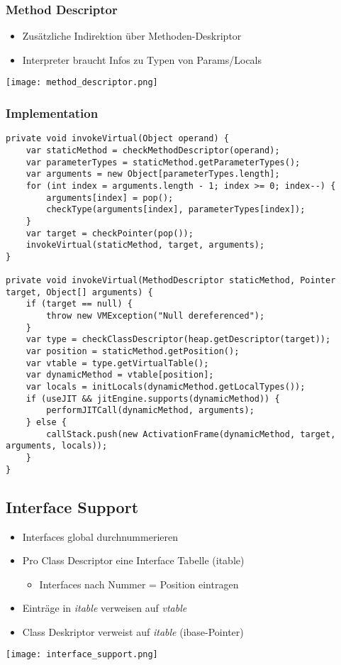 \subsubsection{Method Descriptor}
\begin{itemize}
    \item Zusätzliche Indirektion über Methoden-Deskriptor
    \item Interpreter braucht Infos zu Typen von Params/Locals
\end{itemize}
\texttt{[image: method\_descriptor.png]}
\subsubsection{Implementation}
\begin{lstlisting}
private void invokeVirtual(Object operand) {
    var staticMethod = checkMethodDescriptor(operand);
    var parameterTypes = staticMethod.getParameterTypes();
    var arguments = new Object[parameterTypes.length];
    for (int index = arguments.length - 1; index >= 0; index--) {
        arguments[index] = pop();
        checkType(arguments[index], parameterTypes[index]);
    }
    var target = checkPointer(pop());
    invokeVirtual(staticMethod, target, arguments);
}

private void invokeVirtual(MethodDescriptor staticMethod, Pointer target, Object[] arguments) {
    if (target == null) {
        throw new VMException("Null dereferenced");
    }
    var type = checkClassDescriptor(heap.getDescriptor(target));
    var position = staticMethod.getPosition();
    var vtable = type.getVirtualTable();
    var dynamicMethod = vtable[position];
    var locals = initLocals(dynamicMethod.getLocalTypes());
    if (useJIT && jitEngine.supports(dynamicMethod)) {
        performJITCall(dynamicMethod, arguments);
    } else {
        callStack.push(new ActivationFrame(dynamicMethod, target, arguments, locals));
    }
}
\end{lstlisting}

\subsection{Interface Support}
\begin{itemize}
    \item Interfaces global durchnummerieren
    \item Pro Class Descriptor eine Interface Tabelle (itable)
    \begin{itemize}
        \item Interfaces nach Nummer = Position eintragen
    \end{itemize}
    \item Einträge in \textit{itable} verweisen auf \textit{vtable}
    \item Class Deskriptor verweist auf \textit{itable} (ibase-Pointer)
\end{itemize}
\texttt{[image: interface\_support.png]}

